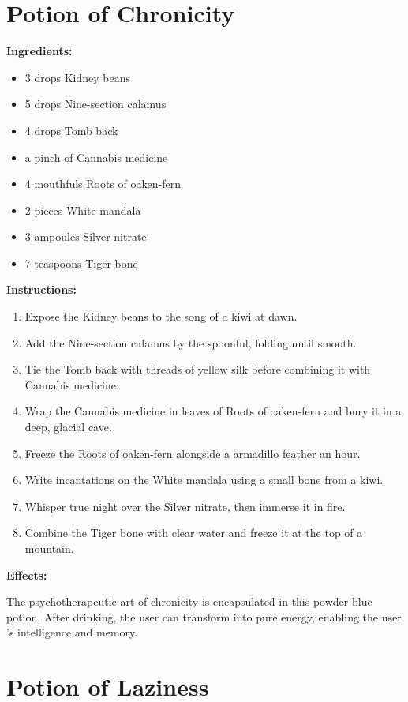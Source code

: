 \documentclass{article}
\begin{document}
\newpage
\section*{Potion of Chronicity}

\textbf{Ingredients:}

\begin{itemize}
  \item 3 drops Kidney beans
  \item 5 drops Nine-section calamus
  \item 4 drops Tomb back
  \item a pinch of Cannabis medicine
  \item 4 mouthfuls Roots of oaken-fern
  \item 2 pieces White mandala
  \item 3 ampoules Silver nitrate
  \item 7 teaspoons Tiger bone
\end{itemize}

\textbf{Instructions:}

\begin{enumerate}
  \item Expose the Kidney beans to the song of a kiwi at dawn.
  \item Add the Nine-section calamus by the spoonful, folding until smooth.
  \item Tie the Tomb back with threads of yellow silk before combining it with Cannabis medicine.
  \item Wrap the Cannabis medicine in leaves of Roots of oaken-fern and bury it in a deep, glacial cave.
  \item Freeze the Roots of oaken-fern alongside a armadillo feather an hour.
  \item Write incantations on the White mandala using a small bone from a kiwi.
  \item Whisper true night over the Silver nitrate, then immerse it in fire.
  \item Combine the Tiger bone with clear water and freeze it at the top of a mountain.
\end{enumerate}

\textbf{Effects:}

The psychotherapeutic art of chronicity is encapsulated in this powder blue potion. After drinking, the user can transform into pure energy, enabling the user 's intelligence and memory.

\newpage
\section*{Potion of Laziness}
\end{document}
